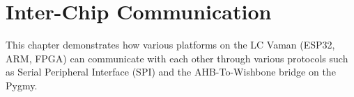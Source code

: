 \chapter{Inter-Chip Communication}
This chapter demonstrates how various platforms on the LC Vaman (ESP32, ARM,
FPGA) can communicate with each other through various protocols such as Serial
Peripheral Interface (SPI) and the AHB-To-Wishbone bridge on the Pygmy.


